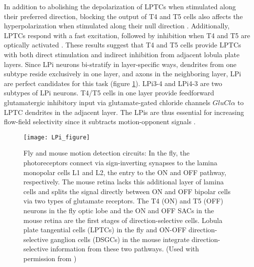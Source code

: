 In addition to abolishing the depolarization of LPTCs when stimulated along their preferred direction, blocking the output of T4 and T5 cells also affects the hyperpolarization when stimulated along their null direction \parencite{Schnell2012}. Additionally, LPTCs respond with a fast excitation, followed by inhibition when T4 and T5 are optically activated \parencite{Mauss2015}. These results suggest that T4 and T5 cells provide LPTCs with both direct stimulation and indirect inhibition from adjacent lobula plate layers. Since LPi neurons bi-stratify in layer-specific ways, dendrites from one subtype reside exclusively in one layer, and axons in the neighboring layer, LPi are perfect candidates for this task (figure \ref{fig:lpifigure}). LPi3-4 and LPi4-3 are two subtypes of LPi neurons. T4/T5 cells in one layer provide feedforward glutamatergic inhibitory input via glutamate-gated chloride channels \textit{$GluCl\alpha$} to LPTC dendrites in the adjacent layer. The LPis are thus essential for increasing flow-field selectivity since it subtracts motion-opponent signals \parencite{Mauss2015}.

\begin{figure}
\centering
\hspace*{-1cm} 
\texttt{[image: LPi\_figure]}
\caption[Lobula plate intrinsic neurons (LPis)] {Fly and mouse motion detection circuits: In the fly, the photoreceptors connect via sign-inverting synapses to the lamina monopolar cells L1 and L2, the entry to the ON and OFF pathway, respectively. The mouse retina lacks this additional layer of lamina cells and splits the signal directly between ON and OFF bipolar cells via two types of glutamate receptors. The T4 (ON) and T5 (OFF) neurons in the fly optic lobe and the ON and OFF SACs in the mouse retina are the first stages of direction-selective cells. Lobula plate tangential cells (LPTCs) in the fly and ON-OFF direction-selective ganglion cells (DSGCs) in the mouse integrate direction-selective information from these two pathways. (Used with permission from \cite{Borst2015})} 
\label{fig:lpifigure}
\end{figure}


